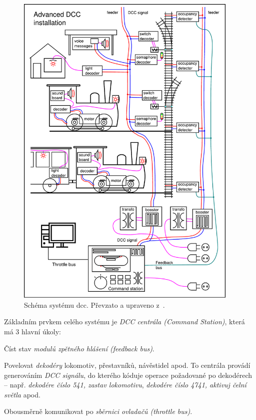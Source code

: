 \begin{figure}[ht!]
\includegraphics[width=0.95\textwidth]{data/schema_dcc_en.pdf}
\caption{Schéma systému \gls{dcc}. Převzato a upraveno z~\cite{dcc_wikipedia:web}.}
\label{fig:dcc-overview}
\end{figure}

Základním prvkem celého systému je \textit{DCC centrála (Command Station)},
která má 3 hlavní úkoly:

\begin{compactenum}
\item Číst stav \textit{modulů zpětného hlášení (feedback bus)}.
\item Povelovat \textit{dekodéry} lokomotiv, přestavníků, návěstidel apod. To
	centrála provádí generováním \textit{DCC signálu}, do kterého kóduje
	operace požadované po dekodérech – např. \textit{dekodére číslo 541, zastav
	lokomotivu}, \textit{dekodére číslo 4741, aktivuj čelní světla} apod.
\item Obousměrně komunikovat po \textit{sběrnici ovladačů (throttle bus)}.
\end{compactenum}

